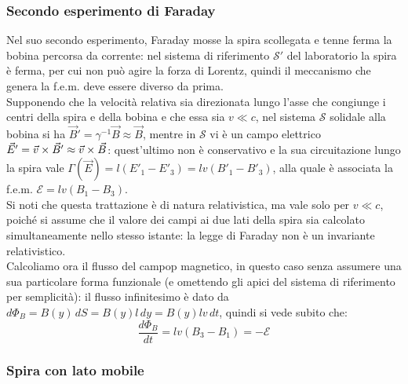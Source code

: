 \documentclass[]{article}
\newcommand{\E}{\mathcal{E}}
\begin{document}
\subsubsection{Secondo esperimento di Faraday}

Nel suo secondo esperimento, Faraday mosse la spira scollegata e tenne ferma la bobina percorsa da corrente: nel sistema di riferimento $ \mathcal{S}' $ del laboratorio la spira è ferma, per cui non può agire la forza di Lorentz, quindi il meccanismo che genera la f.e.m. deve essere diverso da prima. \\ 
%
Supponendo che la velocità relativa sia direzionata lungo l'asse che congiunge i centri della spira e della bobina e che essa sia $ v \ll c $, nel sistema $ \mathcal{S} $ solidale alla bobina si ha $ \vec{B}' = \gamma^{-1} \vec{B} \approx \vec{B} $, mentre in $ \mathcal{S} $ vi è un campo elettrico $ \vec{E}' = \vec{v}\times\vec{B}' \approx \vec{v}\times\vec{B} $: quest'ultimo non è conservativo e la sua circuitazione lungo la spira vale $ \Gamma(\vec{E}) = l (E'_1 - E'_3) = lv (B'_1 - B'_3) $, alla quale è associata la f.e.m. $ \E = lv (B_1 - B_3) $. \\ 
%
Si noti che questa trattazione è di natura relativistica, ma vale solo per $ v \ll c $, poiché si assume che il valore dei campi ai due lati della spira sia calcolato simultaneamente nello stesso istante: la legge di Faraday non è un invariante relativistico. \\ 
%
Calcoliamo ora il flusso del campop magnetico, in questo caso senza assumere una sua particolare forma funzionale (e omettendo gli apici del sistema di riferimento per semplicità): il flusso infinitesimo è dato da $ d\Phi_B = B(y) \,dS = B(y) l \,dy = B(y) lv \,dt $, quindi si vede subito che:
\begin{equation}
	\frac{d\Phi_B}{dt} = lv (B_3 - B_1) = -\E
	\label{eq:4}
\end{equation}

\subsubsection{Spira con lato mobile}
\end{document}
